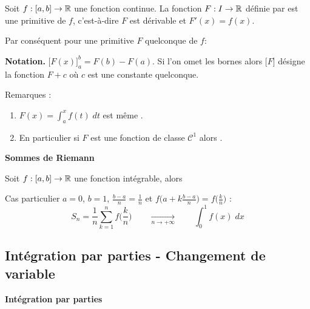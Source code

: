 \documentclass[10pt,class=article,crop=false]{standalone}
\begin{document}
\begin{multicols}{2}
\begin{theoreme}
Soit $f : [a,b] \to \mathbb{R}$ une fonction continue.
La fonction $F:I \to \mathbb{R}$ définie par
est une primitive de $f$, c'est-à-dire $F$ est dérivable et $F'(x)=f(x)$.

Par conséquent pour une primitive $F$ quelconque de $f$:
\end{theoreme}

\textbf{Notation.} $\big[F(x)\big]_a^b=F(b)-F(a)$.
Si l'on omet les bornes alors $\big[F\big]$ désigne la fonction $F+c$ où $c$ est une constante quelconque.

Remarques :
\begin{enumerate}
	
	\item $F(x)=\int_a^x f(t) \; dt$ est même .
	
	\item En particulier si $F$ est une fonction de classe $\mathcal{C}^1$ alors
	.
	
\end{enumerate}



\textbf{Sommes de Riemann}


\begin{theoreme}
Soit $f : [a,b] \to \mathbb{R}$ une fonction intégrable, alors 
\end{theoreme}


Cas particulier $a=0$, $b=1$, $\frac{b-a}{n}=\frac1n$ et
$f\big(a+k\frac{b-a}{n}\big) = f\big(\frac kn\big)$ : 
$$S_n = \frac{1}{n} \sum_{k=1}^{n} f\big(\frac kn \big)
\qquad \xrightarrow[n\to+\infty]{} \qquad \int_0^1 f(x) \; dx$$





\subsection{Intégration par parties - Changement de variable}

\textbf{Intégration par parties}


\end{multicols}
\end{document}
